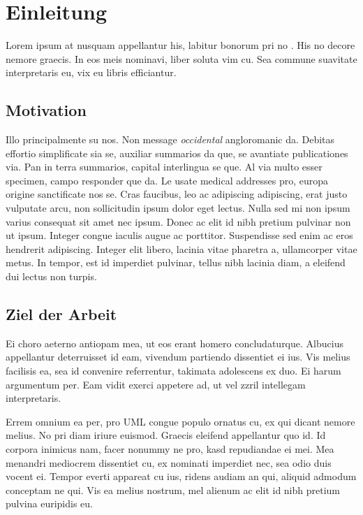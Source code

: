 \chapter{Einleitung}
\label{ch:intro}
Lorem ipsum at nusquam appellantur his, labitur bonorum pri no \citep{dueck:trio}. His no decore nemore graecis. In eos meis nominavi, liber soluta vim cu. Sea commune suavitate interpretaris eu, vix eu libris efficiantur.

%
%
\section{Motivation}
\label{sec:intro:motivation}
Illo principalmente su nos. Non message \emph{occidental} angloromanic da. Debitas effortio simplificate sia se, auxiliar summarios da que, se avantiate publicationes via. Pan in terra summarios, capital interlingua se que. Al via multo esser specimen, campo responder que da. Le usate medical addresses pro, europa origine sanctificate nos se. Cras faucibus, leo ac adipiscing adipiscing, erat justo vulputate arcu, non sollicitudin ipsum dolor eget lectus. Nulla sed mi non ipsum varius consequat sit amet nec ipsum. Donec ac elit id nibh pretium pulvinar non ut ipsum. Integer congue iaculis augue ac porttitor. Suspendisse sed enim ac eros hendrerit adipiscing. Integer elit libero, lacinia vitae pharetra a, ullamcorper vitae metus. In tempor, est id imperdiet pulvinar, tellus nibh lacinia diam, a eleifend dui lectus non turpis.

%
%
\section{Ziel der Arbeit}
\label{sec:intro:goal}
Ei choro aeterno antiopam mea, ut eos erant homero concludaturque. Albucius appellantur deterruisset id eam, vivendum partiendo dissentiet ei ius. Vis melius facilisis ea, sea id convenire referrentur, takimata adolescens ex duo. Ei harum argumentum per. Eam vidit exerci appetere ad, ut vel zzril intellegam interpretaris.

Errem omnium ea per, pro \ac{UML} congue populo ornatus cu, ex qui dicant nemore melius. No pri diam iriure euismod. Graecis eleifend appellantur quo id. Id corpora inimicus nam, facer nonummy ne pro, kasd repudiandae ei mei. Mea menandri mediocrem dissentiet cu, ex nominati imperdiet nec, sea odio duis vocent ei. Tempor everti appareat cu ius, ridens audiam an qui, aliquid admodum conceptam ne qui. Vis ea melius nostrum, mel alienum ac elit id nibh pretium pulvina euripidis eu.

